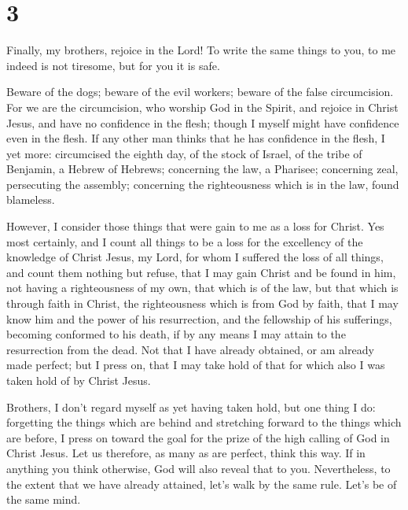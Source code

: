 \hypertarget{section-2}{%
\section{3}\label{section-2}}

 Finally, my brothers, rejoice in the Lord! To write the
same things to you, to me indeed is not tiresome, but for you it is
safe.

 Beware of the dogs; beware of the evil workers; beware of
the false circumcision.  For we are the circumcision, who
worship God in the Spirit, and rejoice in Christ Jesus, and have no
confidence in the flesh;  though I myself might have
confidence even in the flesh. If any other man thinks that he has
confidence in the flesh, I yet more:  circumcised the
eighth day, of the stock of Israel, of the tribe of Benjamin, a Hebrew
of Hebrews; concerning the law, a Pharisee;  concerning
zeal, persecuting the assembly; concerning the righteousness which is in
the law, found blameless.

 However, I consider those things that were gain to me as
a loss for Christ.  Yes most certainly, and I count all
things to be a loss for the excellency of the knowledge of Christ Jesus,
my Lord, for whom I suffered the loss of all things, and count them
nothing but refuse, that I may gain Christ  and be found
in him, not having a righteousness of my own, that which is of the law,
but that which is through faith in Christ, the righteousness which is
from God by faith,  that I may know him and the power of
his resurrection, and the fellowship of his sufferings, becoming
conformed to his death,  if by any means I may attain to
the resurrection from the dead.  Not that I have already
obtained, or am already made perfect; but I press on, that I may take
hold of that for which also I was taken hold of by Christ Jesus.

 Brothers, I don't regard myself as yet having taken
hold, but one thing I do: forgetting the things which are behind and
stretching forward to the things which are before,  I
press on toward the goal for the prize of the high calling of God in
Christ Jesus.  Let us therefore, as many as are perfect,
think this way. If in anything you think otherwise, God will also reveal
that to you.  Nevertheless, to the extent that we have
already attained, let's walk by the same rule. Let's be of the same
mind.

